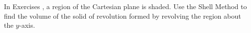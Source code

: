 {\noindent In Exercises}
{, a region of the Cartesian plane is shaded. Use the Shell Method to find the volume of the solid of revolution formed by revolving the region about the $y$-axis.
}
